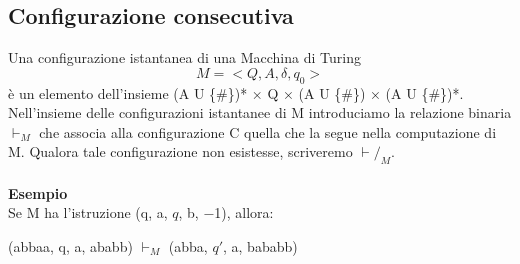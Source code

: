 \subsection{Configurazione consecutiva}
Una configurazione istantanea di una Macchina di Turing $$M=<Q,A,\delta,q_0>$$ è un elemento dell’insieme (A U \{\#\})* × Q × (A U \{\#\}) × (A U \{\#\})*.\\
Nell’insieme delle configurazioni istantanee di M introduciamo la relazione binaria  $\vdash_M$  che associa alla configurazione C quella che la segue nella computazione di M. Qualora tale configurazione non esistesse, scriveremo $\vdash/_M$.\\\\
\textbf{Esempio}\\
Se M ha l’istruzione (q, a, $q$, b, $-$1), allora:
\begin{center}
    (abbaa, q, a, ababb) $\vdash_M$ (abba, $q'$, a, bababb)
\end{center}
